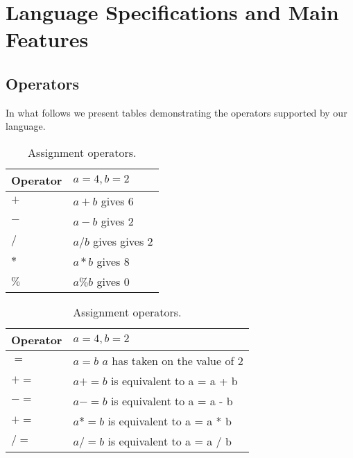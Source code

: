 \section{Language Specifications and Main Features}
\label{sect:spec}

\subsection*{Operators}
In what follows we present tables demonstrating the operators supported by our
language.%


\begin{table}[h]
\begin{center}
    \parbox{.45\linewidth}{
        \begin{tabular}{| l | l |}
        \hline
        Operator & $a=4, b=2$ \\ \hline
        $+$ &  $a + b$ gives 6 \\  \hline
        $-$ &  $a - b$ gives 2  \\ \hline
        $/$ &  $a / b$ gives gives 2 \\ \hline
        $*$ &  $a * b$ gives 8  \\ \hline
        $\%$ & $a \% b$ gives 0 \\ \hline
        \end{tabular}
        \caption{Arithmetic operators.}
    }
    \parbox{.45\linewidth}{
        \begin{tabular}{| l | l |}
        \hline
        Operator & $a=4, b=2$ \\ \hline
        $=$  &  $a = b$  $a$ has taken on the value of 2 \\ \hline
        $+=$ &  $a += b$ is equivalent to a = a + b\\ \hline
        $-=$ &  $a -= b$ is equivalent to a = a - b \\ \hline
        $+=$ &  $a *= b$ is equivalent to a = a * b\\ \hline
        $/=$ &  $a /= b$ is equivalent to a = a / b\\ \hline
        \end{tabular}
        \caption{Assignment operators.}
    }
\end{center}
\end{table}

